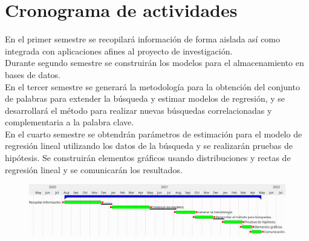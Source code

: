 \section {Cronograma de actividades}
En el primer semestre se recopilará información de forma aislada así como integrada con aplicaciones afines al proyecto de investigación.\\
Durante segundo semestre se construirán los modelos para el almacenamiento en bases de datos.\\
En el tercer semestre se generará la metodología para la obtención del conjunto de palabras para extender la búsqueda y estimar modelos de regresión, y se desarrollará el método para realizar nuevas búsquedas correlacionadas y complementaria a la palabra clave.\\
En el cuarto semestre se obtendrán parámetros de estimación para el modelo de regresión lineal utilizando los datos de la búsqueda y se realizarán pruebas de hipótesis. Se construirán elementos gráficos usando distribuciones y rectas de regresión lineal y se comunicarán los resultados.
\begin{figure}[H]\centering\includegraphics[width=.95\linewidth]{gantt.png}\end{figure}